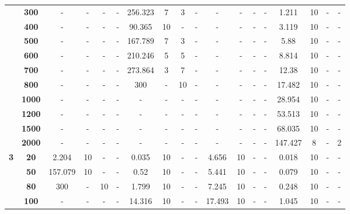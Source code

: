 \documentclass[12pt]{article}
\begin{document}
\begin{table}[h]
\begin{tabular}{cccccccccccccccccc}
          & \textbf{300} & -     & -     & -     & -     & 256.323 & 7     & 3     & -     & -     & -     & -     & -     & 1.211 & 10    & -     & - \\
          & \textbf{400} & -     & -     & -     & -     & 90.365 & 10    & -     & -     & -     & -     & -     & -     & 3.119 & 10    & -     & - \\
          & \textbf{500} & -     & -     & -     & -     & 167.789 & 7     & 3     & -     & -     & -     & -     & -     & 5.88  & 10    & -     & - \\
          & \textbf{600} & -     & -     & -     & -     & 210.246 & 5     & 5     & -     & -     & -     & -     & -     & 8.814 & 10    & -     & - \\
          & \textbf{700} & -     & -     & -     & -     & 273.864 & 3     & 7     & -     & -     & -     & -     & -     & 12.38 & 10    & -     & - \\
          & \textbf{800} & -     & -     & -     & -     & 300   & -     & 10    & -     & -     & -     & -     & -     & 17.482 & 10    & -     & - \\
          & \textbf{1000} & -     & -     & -     & -     & -     & -     & -     & -     & -     & -     & -     & -     & 28.954 & 10    & -     & - \\
          & \textbf{1200} & -     & -     & -     & -     & -     & -     & -     & -     & -     & -     & -     & -     & 53.513 & 10    & -     & - \\
          & \textbf{1500} & -     & -     & -     & -     & -     & -     & -     & -     & -     & -     & -     & -     & 68.035 & 10    & -     & - \\
          & \textbf{2000} & -     & -     & -     & -     & -     & -     & -     & -     & -     & -     & -     & -     & 147.427 & 8     & -     & 2 \\
    \midrule
    \multirow{8}[2]{*}{\textbf{3}} & \textbf{20} & 2.204 & 10    & -     & -     & 0.035 & 10    & -     & -     & 4.656 & 10    & -     & -     & 0.018 & 10    & -     & - \\
          & \textbf{50} & 157.079 & 10    & -     & -     & 0.52  & 10    & -     & -     & 5.441 & 10    & -     & -     & 0.079 & 10    & -     & - \\
          & \textbf{80} & 300   & -     & 10    & -     & 1.799 & 10    & -     & -     & 7.245 & 10    & -     & -     & 0.248 & 10    & -     & - \\
          & \textbf{100} & -     & -     & -     & -     & 14.316 & 10    & -     & -     & 17.493 & 10    & -     & -     & 1.045 & 10    & -     & - \\

\end{tabular}
\end{table}
\end{document}
